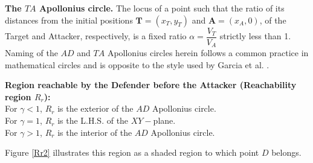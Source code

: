 \textbf{The $TA$ Apollonius circle.} The locus of a point such that the ratio of its distances from the initial positions $\boldsymbol{T}=(x_{T},y_{T})$ and $\boldsymbol{A}=(x_{A},0)$, of the Target and Attacker, respectively, is a fixed ratio $\alpha= \dfrac{V_{T}}{V_{A}}$ strictly less than 1. Naming of the $AD$ and $TA$ Apollonius circles herein follows a common practice in mathematical circles \cite{ayoub2003proving,ayoub2006circle,partensky2008circle} and is opposite to the style used by Garcia et al. \cite{pachter2014active,garcia2015active,garcia2015escape}.

\textbf{Region reachable by the Defender before the Attacker (Reachability region $R_r$):}  \\
For $\gamma<1$, $R_r$ is the exterior of the $AD$ Apollonius circle.\\
For $\gamma=1$, $R_r$ is the L.H.S. of the $XY-$plane.\\
For $\gamma>1$, $R_r$ is the interior of the $AD$ Apollonius circle. 

Figure \ref{Rr2} illustrates this region as a shaded region to which point $D$ belongs.

